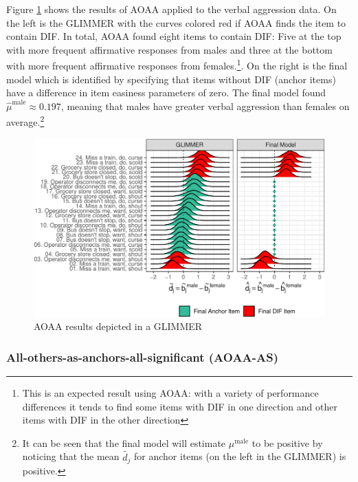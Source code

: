 \documentclass[
  english,
  man,floatsintext]{apa6}
\begin{document}
Figure \ref{fig:aoaa} shows the results of AOAA applied to the verbal aggression data. On the left is the GLIMMER with the curves colored red if AOAA finds the item to contain DIF. In total, AOAA found eight items to contain DIF: Five at the top with more frequent affirmative responses from males and three at the bottom with more frequent affirmative responses from females.\footnote{This is an expected result using AOAA: with a variety of performance differences it tends to find some items with DIF in one direction and other items with DIF in the other direction}. On the right is the final model which is identified by specifying that items without DIF (anchor items) have a difference in item easiness parameters of zero. The final model found \(\hat \mu^\text{male} \approx 0.197\), meaning that males have greater verbal aggression than females on average.\footnote{It can be seen that the final model will estimate \(\mu^\text{male}\) to be positive by noticing that the mean \(\tilde {d_j}\) for anchor items (on the left in the GLIMMER) is positive.}

\begin{figure}[h]

{\centering \includegraphics{paper_apa_files/figure-latex/aoaa-1}

}

\caption{AOAA results depicted in a GLIMMER}\label{fig:aoaa}
\end{figure}

\hypertarget{all-others-as-anchors-all-significant-aoaa-as}{%
\subsubsection{All-others-as-anchors-all-significant (AOAA-AS)}\label{all-others-as-anchors-all-significant-aoaa-as}}
\end{document}
